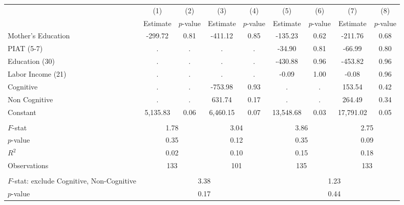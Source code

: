 \begin{tabular}{lcccccccc} \toprule
 & (1) & (2) & (3) & (4) & (5) & (6) & (7) & (8) \\
 & Estimate & $p$-value & Estimate & $p$-value  & Estimate & $p$-value  & Estimate & $p$-value  \\ \midrule 
Mother's Education &      -299.72 &         0.81 &      -411.12 &         0.85 &      -135.23 &         0.62 &      -211.76 &         0.68 \\  
PIAT (5-7) &            . &            . &            . &            . &       -34.90 &         0.81 &       -66.99 &         0.80 \\  
Education (30) &            . &            . &            . &            . &      -430.88 &         0.96 &      -453.82 &         0.96 \\  
Labor Income (21) &            . &            . &            . &            . &        -0.09 &         1.00 &        -0.08 &         0.96 \\  
Cognitive &            . &            . &      -753.98 &         0.93 &            . &            . &       153.54 &         0.42 \\  
Non Cognitive &            . &            . &       631.74 &         0.17 &            . &            . &       264.49 &         0.34 \\  
Constant &     5,135.83 &         0.06 &     6,460.15 &         0.07 &    13,548.68 &         0.03 &    17,791.02 &         0.05 \\   \\ \midrule
$F$-stat &         \multicolumn{2}{c}{1.78} &         \multicolumn{2}{c}{3.04} &               \multicolumn{2}{c}{3.86} &            \multicolumn{2}{c}{2.75}  \\  
$p$-value &         \multicolumn{2}{c}{0.35} &         \multicolumn{2}{c}{0.12} &               \multicolumn{2}{c}{0.35} &            \multicolumn{2}{c}{0.09}  \\  
$R^2$ &         \multicolumn{2}{c}{0.02} &         \multicolumn{2}{c}{0.10} &               \multicolumn{2}{c}{0.15} &            \multicolumn{2}{c}{0.18}  \\  
Observations &       \multicolumn{2}{c}{133} &           \multicolumn{2}{c}{101} &         \multicolumn{2}{c}{135} &            \multicolumn{2}{c}{133}  \\  \\ \midrule
$F$-stat: exclude Cognitive, Non-Cognitive &              \multicolumn{4}{c}{3.38} &             \multicolumn{4}{c}{1.23}  \\  
$p$-value &            \multicolumn{4}{c}{0.17} &               \multicolumn{4}{c}{0.44}  \\   \bottomrule \end{tabular}

